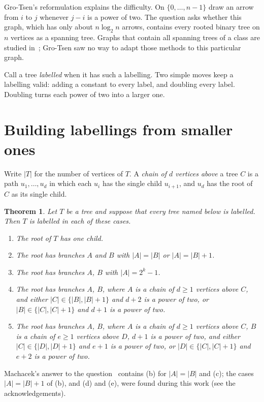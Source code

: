 \documentclass[11pt]{article}
\newtheorem{theorem}{Theorem}
\theoremstyle{remark}
\begin{document}
Gro-Tsen's reformulation explains the difficulty. On $\{0,\dots,n-1\}$ draw an arrow from $i$ to
$j$ whenever $j-i$ is a power of two. The question asks whether this graph, which has only about
$n\log_2 n$ arrows, contains every rooted binary tree on $n$ vertices as a spanning tree. Graphs
that contain all spanning trees of a class are studied in~\cite{CG}; Gro-Tsen saw no way to
adapt those methods to this particular graph.

Call a tree \emph{labelled} when it has such a labelling. Two simple moves keep a labelling
valid: adding a constant to every label, and doubling every label. Doubling turns each power of
two into a larger one.

\section{Building labellings from smaller ones}

Write $|T|$ for the number of vertices of $T$. A \emph{chain of $d$ vertices above} a tree $C$ is
a path $u_1,\dots,u_d$ in which each $u_i$ has the single child $u_{i+1}$, and $u_d$ has the root
of $C$ as its single child.

\begin{theorem}\label{thm:reductions}
Let $T$ be a tree and suppose that every tree named below is labelled. Then $T$ is labelled in
each of these cases.
\begin{enumerate}
\item[(a)] The root of $T$ has one child.
\item[(b)] The root has branches $A$ and $B$ with $|A|=|B|$ or $|A|=|B|+1$.
\item[(c)] The root has branches $A$, $B$ with $|A|=2^k-1$.
\item[(d)] The root has branches $A$, $B$, where $A$ is a chain of $d\ge1$ vertices above $C$, and
either $|C|\in\{|B|,|B|+1\}$ and $d+2$ is a power of two, or $|B|\in\{|C|,|C|+1\}$ and $d+1$ is
a power of two.
\item[(e)] The root has branches $A$, $B$, where $A$ is a chain of $d\ge1$ vertices above $C$, $B$ is
a chain of $e\ge1$ vertices above $D$, $d+1$ is a power of two, and either $|C|\in\{|D|,|D|+1\}$
and $e+1$ is a power of two, or $|D|\in\{|C|,|C|+1\}$ and $e+2$ is a power of two.
\end{enumerate}
\end{theorem}

Machacek's answer to the question~\cite{MOa} contains (b) for $|A|=|B|$ and (c); the cases
$|A|=|B|+1$ of (b), and (d) and (e), were found during this work (see the acknowledgements).
\end{document}
